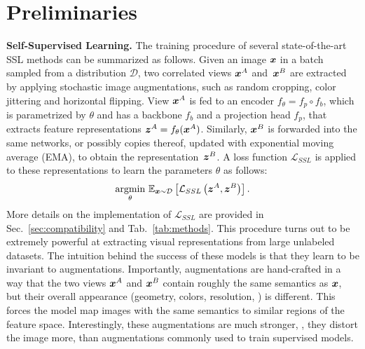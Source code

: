 \vspace{-10pt}
\section{Preliminaries}
\label{sec:preliminaries}
\vspace{-7pt}

\noindent\textbf{Self-Supervised Learning.}
The training procedure of several state-of-the-art SSL methods \cite{zbontar2021barlow,chen2020simple,he2020momentum,caron2020unsupervised,caron2021emerging,bardes2021vicreg, dwibedi2021little,grill2020bootstrap} can be summarized as follows. Given an image $\boldsymbol{x}$ in a batch sampled from a distribution $\mathcal{D}$, two correlated views $\boldsymbol{x}^A$ and~$\boldsymbol{x}^B$ are extracted by applying stochastic image augmentations, such as random cropping, color jittering and horizontal flipping. View $\boldsymbol{x}^A$ is fed to an encoder $f_\theta = f_p \circ f_b$, which is parametrized by $\theta$ and has a backbone $f_b$ and a projection head $f_p$, that  extracts feature representations $\boldsymbol{z}^A = f_\theta(\boldsymbol{x}^A)$. Similarly, $\boldsymbol{x}^B$ is forwarded into the same networks, or possibly copies thereof, updated with exponential moving average (EMA), to obtain the representation~$\boldsymbol{z}^B$. A loss function $\mathcal{L}_{SSL}$ is applied to these representations to learn the parameters $\theta$ as follows:
\begin{equation}
\label{eq:ssl_obj}
    \underset{\theta}{\operatorname{argmin}} \,\, \mathbb{E}_{\boldsymbol{x} \sim \mathcal{D}}\left[\mathcal{L}_{SSL}\left(\boldsymbol{z}^A, \boldsymbol{z}^B\right)\right].
\end{equation}
More details on the implementation of $\mathcal{L}_{SSL}$ are provided in Sec.~\ref{sec:compatibility} and Tab.~\ref{tab:methods}. This procedure turns out to be extremely powerful at extracting visual representations from large unlabeled datasets. The intuition behind the success of these models is that they learn to be invariant to augmentations. Importantly, augmentations are hand-crafted in a way that the two views $\boldsymbol{x}^A$ and $\boldsymbol{x}^B$ contain roughly the same semantics as $\boldsymbol{x}$, but their overall appearance (geometry, colors, resolution, \etc) is different. This forces the model map images with the same semantics to similar regions of the feature space. Interestingly, these augmentations are much stronger, \ie, they distort the image more, than augmentations commonly used to train supervised models.

